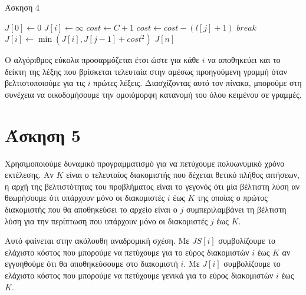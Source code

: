 \documentclass[11pt,a4paper]{book}
\begin{document}
\begin{algorithm}[H]
\caption{\textgreek{Άσκηση 4}}
\begin{algorithmic}[1]
	\State $J[ 0 ] \gets 0$
		\State $J[ i ] \gets \infty$
		\State $cost \gets C + 1$
			\State $cost \gets cost - ( l[ j ] + 1 )$
				\State $break$
			\EndIf
			\State $J[ i ] \gets \min( J[ i ], J[j - 1] + cost^2 )$
		\EndFor
	\EndFor
	\State \Return $J[ n ]$
\EndProcedure
\end{algorithmic}
\end{algorithm}

Ο αλγόριθμος εύκολα προσαρμόζεται έτσι ώστε για κάθε $i$ να αποθηκεύει και το δείκτη της λέξης που βρίσκεται τελευταία στην αμέσως προηγούμενη γραμμή όταν βελτιστοποιούμε για τις $i$ πρώτες λέξεις. Διασχίζοντας αυτό τον πίνακα, μπορούμε στη συνέχεια να οικοδομήσουμε την ομοιόμορφη κατανομή του όλου κειμένου σε γραμμές.

\section*{Άσκηση 5}
Χρησιμοποιούμε δυναμικό προγραμματισμό για να πετύχουμε πολυωνυμικό χρόνο εκτέλεσης. Αν $K$ είναι ο τελευταίος διακομιστής που δέχεται θετικό πλήθος αιτήσεων, η αρχή της βελτιστότητας του προβλήματος είναι το γεγονός ότι μία βέλτιστη λύση αν θεωρήσουμε ότι υπάρχουν μόνο οι διακομιστές $i$ έως $K$ της οποίας ο πρώτος διακομιστής που θα αποθηκεύσει το αρχείο είναι ο $j$ συμπεριλαμβάνει τη βέλτιστη λύση για την περίπτωση που υπάρχουν μόνο οι διακομιστές $j$ έως $K$.

Αυτό φαίνεται στην ακόλουθη αναδρομική σχέση. Με $JS[ i ]$ συμβολίζουμε το ελάχιστο κόστος που μπορούμε να πετύχουμε για το εύρος διακομιστών $i$ έως $K$ αν εγγυηθούμε ότι θα αποθηκεύσουμε στο διακομιστή $i$. Με $J[ i ]$ συμβολίζουμε το ελάχιστο κόστος που μπορούμε να πετύχουμε γενικά για το εύρος διακομιστών $i$ έως $K$.
\end{document}
